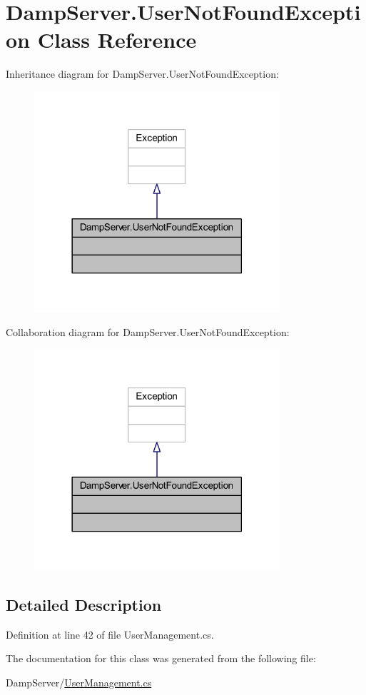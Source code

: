 \hypertarget{class_damp_server_1_1_user_not_found_exception}{\section{Damp\-Server.\-User\-Not\-Found\-Exception Class Reference}
\label{class_damp_server_1_1_user_not_found_exception}
}


Inheritance diagram for Damp\-Server.\-User\-Not\-Found\-Exception\-:\nopagebreak
\begin{figure}[H]
\begin{center}
\leavevmode
\includegraphics[width=258pt]{class_damp_server_1_1_user_not_found_exception__inherit__graph}
\end{center}
\end{figure}


Collaboration diagram for Damp\-Server.\-User\-Not\-Found\-Exception\-:\nopagebreak
\begin{figure}[H]
\begin{center}
\leavevmode
\includegraphics[width=258pt]{class_damp_server_1_1_user_not_found_exception__coll__graph}
\end{center}
\end{figure}


\subsection{Detailed Description}


Definition at line 42 of file User\-Management.\-cs.



The documentation for this class was generated from the following file\-:\begin{DoxyCompactItemize}
\item 
Damp\-Server/\hyperlink{_user_management_8cs}{User\-Management.\-cs}\end{DoxyCompactItemize}
